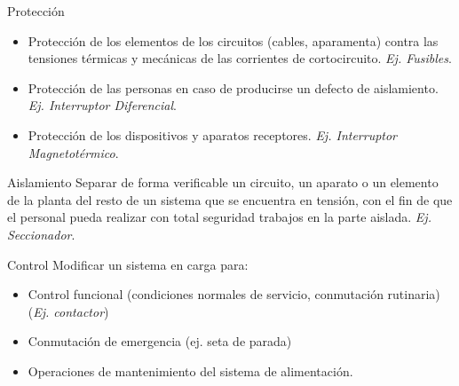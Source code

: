 \documentclass[xcolor={usenames,svgnames,dvipsnames}]{beamer}
\begin{document}
\begin{frame}[label={sec:org2d510ef}]{Protección}
\begin{itemize}
\item Protección de los \alert{elementos de los circuitos} (cables,
aparamenta) contra las tensiones térmicas y mecánicas de las
corrientes de cortocircuito. \emph{Ej. Fusibles}.

\item Protección de las \alert{personas} en caso de producirse un defecto de aislamiento. \emph{Ej. Interruptor Diferencial}.

\item Protección de los \alert{dispositivos y aparatos receptores}. \emph{Ej. Interruptor Magnetotérmico}.
\end{itemize}
\end{frame}

\begin{frame}[label={sec:org107a52a}]{Aislamiento}
Separar de forma verificable un circuito, un aparato o un elemento de la planta del resto de un sistema que se encuentra en tensión, con el fin de que el personal pueda realizar con total seguridad trabajos en la parte aislada. 
\emph{Ej. Seccionador}.
\end{frame}

\begin{frame}[label={sec:orgedc2c69}]{Control}
Modificar un sistema en carga para:

\begin{itemize}
\item Control funcional (condiciones normales de servicio, conmutación rutinaria) (\emph{Ej. contactor})

\item Conmutación de emergencia (ej. seta de parada)

\item Operaciones de mantenimiento del sistema de alimentación.
\end{itemize}
\end{frame}
\end{document}
